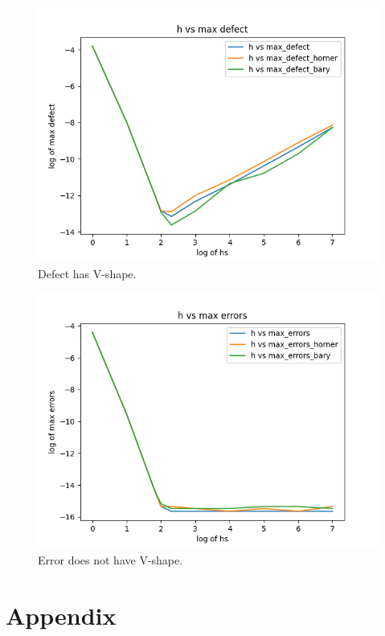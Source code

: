 \documentclass{report}
\begin{document}
\begin{figure}[H]
\centering
\includegraphics[width=0.7\linewidth]{./figures/further_work_defect_is_v_shape_hb6}
\caption{Defect has V-shape.}
\label{fig:defect_is_v_shape}
\end{figure}

\begin{figure}[H]
\centering
\includegraphics[width=0.7\linewidth]{./figures/further_work_error_is_not_v_shape_hb6}
\caption{Error does not have V-shape.}
\label{fig:error_is_not_v_shape}
\end{figure}





\chapter{Appendix}


\end{document}
